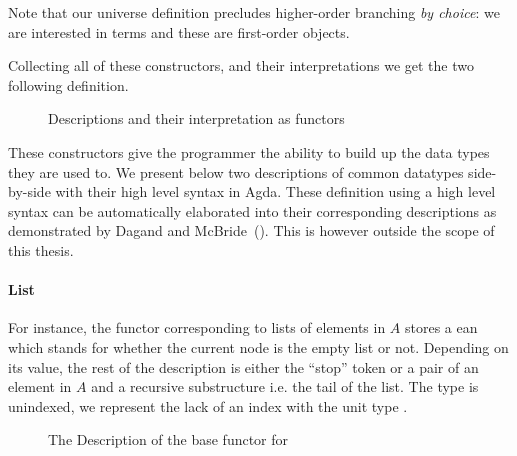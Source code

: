 Note that our universe definition precludes higher-order branching
\emph{by choice}: we are interested in terms and these are first-order
objects.

Collecting all of these constructors, and their interpretations we
get the two following definition.

\begin{figure}[h]
  \begin{minipage}[t]{0.5\textwidth}
    \begin{AgdaMultiCode}
    \end{AgdaMultiCode}
  \end{minipage}\begin{minipage}[t]{0.5\textwidth}
    \begin{AgdaMultiCode}
    \end{AgdaMultiCode}
  \end{minipage}
  \caption{Descriptions and their interpretation as functors}
\end{figure}

These constructors give the programmer the ability to build up the data
types they are used to.
%
We present below two descriptions of common datatypes side-by-side with
their high level syntax in Agda.
%
These definition using a high level syntax can be automatically elaborated
into their corresponding descriptions as demonstrated by
Dagand and McBride~(\citeyear{DBLP:journals/corr/abs-1210-6390}).
This is however outside the scope of this thesis.

\paragraph{List}
For instance, the functor corresponding
to lists of elements in $A$ stores a ean which stands for whether
the current node is the empty list or not. Depending on its value, the
rest of the description is either the ``stop'' token or a pair of an element
in $A$ and a recursive substructure i.e. the tail of the list.
The  type is unindexed, we represent the lack of an index with
the unit type \AD{$\top$}.

\begin{figure}[h]
\begin{minipage}{0.5\textwidth}
\end{minipage}\begin{minipage}{0.5\textwidth}
\end{minipage}
\caption{The Description of the base functor for ~}
\label{figure:listD}
\end{figure}

